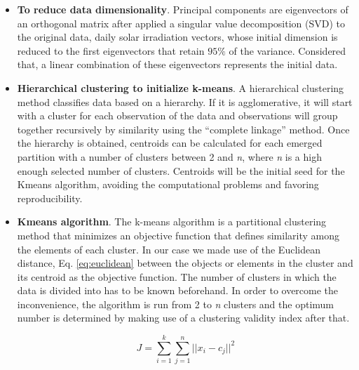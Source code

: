 \begin{itemize}
\item \textbf{To reduce data dimensionality}. Principal components are eigenvectors of an orthogonal matrix after applied a singular value decomposition (SVD) to the original data, daily solar irradiation vectors, whose initial dimension is reduced to the first eigenvectors that retain $95\%$ of the variance. Considered that, a linear combination of these eigenvectors represents the initial data.
\item \textbf{Hierarchical clustering to initialize k-means}. A hierarchical clustering method classifies data based on a hierarchy. If it is agglomerative, it will start with a cluster for each observation of the data and observations will group together recursively by similarity using the “complete linkage” method. Once the hierarchy is obtained, centroids can be calculated for each emerged partition with a number of clusters between 2 and \textit{n}, where \textit{n} is a high enough selected number of clusters. Centroids will be the initial seed for the Kmeans algorithm, avoiding the computational problems and favoring reproducibility.
\item \textbf{Kmeans algorithm}. The k-means algorithm is a partitional clustering method that minimizes an objective function that defines similarity among the elements of each cluster. In our case we made use of the Euclidean distance, Eq. \ref{eq:euclidean} between the objects or elements in the cluster and its centroid as the objective function. The number of clusters in which the data is divided into has to be known beforehand. In order to overcome the inconvenience, the algorithm is run from 2 to \textit{n} clusters and the optimum number is determined by making use of a clustering validity index after that.

\begin{equation}\label{eq:euclidean}
    J =\sum_{i=1}^{k}\sum_{j=1}^{n}{||x_i-c_j||}^2
\end{equation}




\end{itemize}
